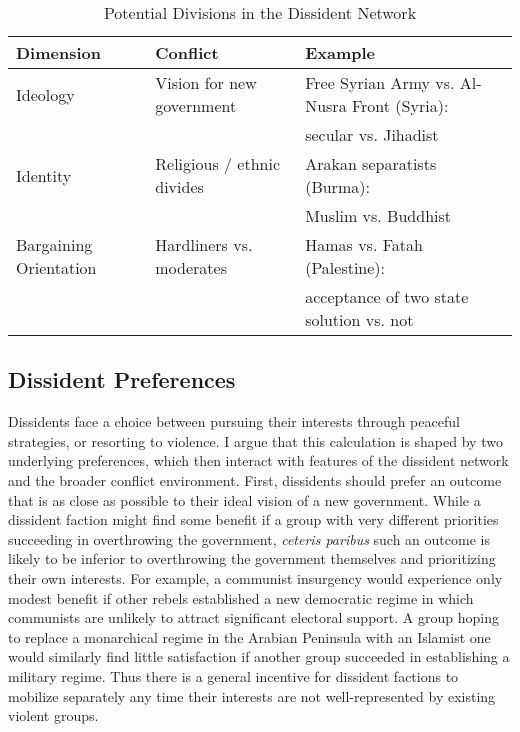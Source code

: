 \begin{table}
\begin{tabular}{lll}
Dimension & Conflict & Example\\
\hline
Ideology & Vision for new government & Free Syrian Army vs. Al-Nusra Front (Syria):\\
& & secular vs. Jihadist\\
Identity & Religious / ethnic divides & Arakan separatists (Burma):\\
& & Muslim vs. Buddhist\\
Bargaining Orientation & Hardliners vs. moderates & Hamas vs. Fatah (Palestine):\\
& & acceptance of two state solution vs. not
\end{tabular}
\caption{Potential Divisions in the Dissident Network}
\end{table}

\subsection{Dissident Preferences}

Dissidents face a choice between pursuing their interests through peaceful strategies, or resorting to violence. I argue that this calculation is shaped by two underlying preferences, which then interact with features of the dissident network and the broader conflict environment. First, dissidents should prefer an outcome that is as close as possible to their ideal vision of a new government. While a dissident faction might find some benefit if a group with very different priorities succeeding in overthrowing the government, \textit{ceteris paribus} such an outcome is likely to be inferior to overthrowing the government themselves and prioritizing their own interests. For example, a communist insurgency would experience only modest benefit if other rebels established a new democratic regime in which communists are unlikely to attract significant electoral support. A group hoping to replace a monarchical regime in the Arabian Peninsula with an Islamist one would similarly find little satisfaction if another group succeeded in establishing a military regime. Thus there is a general incentive for dissident factions to mobilize separately any time their interests are not well-represented by existing violent groups.

